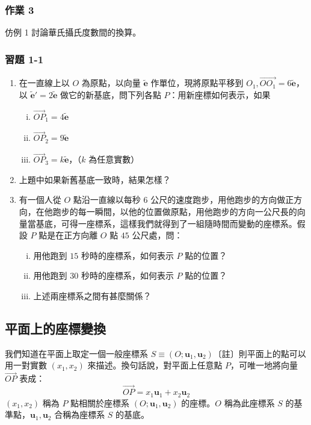 \subsubsection*{作業 3}
仿例 1 討論華氏攝氏度數間的換算。

\subsubsection*{習題 1-1}
\begin{enumerate}
  \item 在一直線上以 $O$ 為原點，以向量 $\tilde{\mathbf{e}}$ 作單位，現將原點平移到 $O_1, \vec{OO_1} = 6\tilde{\mathbf{e}}$，以 $\tilde{\mathbf{e}}' = 2\tilde{\mathbf{e}}$ 做它的新基底，問下列各點 $P$：用新座標如何表示，如果
  \begin{enumerate}[(i)]
    \item $\vec{OP}_1 = 4\tilde{\mathbf{e}}$
    \item $\vec{OP}_2 = 9\tilde{\mathbf{e}}$
    \item $\vec{OP}_3 = k\tilde{\mathbf{e}}$，（$k$ 為任意實數）
  \end{enumerate}
  \item 上題中如果新舊基底一致時，結果怎樣？
  \item 有一個人從 $O$ 點沿一直線以每秒 $6$ 公尺的速度跑步，用他跑步的方向做正方向，在他跑步的每一瞬間，以他的位置做原點，用他跑步的方向一公尺長的向量當基底，可得一座標系，這樣我們就得到了一組隨時間而變動的座標系。假設 $P$ 點是在正方向離 $O$ 點 $45$ 公尺處，問：
  \begin{enumerate}[(i)]
    \item 用他跑到 $15$ 秒時的座標系，如何表示 $P$ 點的位置？
    \item 用他跑到 $30$ 秒時的座標系，如何表示 $P$ 點的位置？
    \item 上述兩座標系之間有甚麼關係？
  \end{enumerate}
\end{enumerate}
\subsection{平面上的座標變換}
\label{sec:b4-1-2}

我們知道在平面上取定一個一般座標系 $S \equiv (O; \mathbf{u}_1, \mathbf{u}_2)$〔註〕則平面上的點可以用一對實數 $(x_1, x_2)$ 來描述。換句話說，對平面上任意點 $P$，可唯一地將向量 $\vec{OP}$ 表成：
\[ \vec{OP} = x_1 \mathbf{u}_1 + x_2 \mathbf{u}_2 \]
$(x_1, x_2)$ 稱為 $P$ 點相關於座標系 $(O; \mathbf{u}_1, \mathbf{u}_2)$ 的座標。$O$ 稱為此座標系 $S$ 的基準點，$\mathbf{u}_1, \mathbf{u}_2$ 合稱為座標系 $S$ 的基底。

